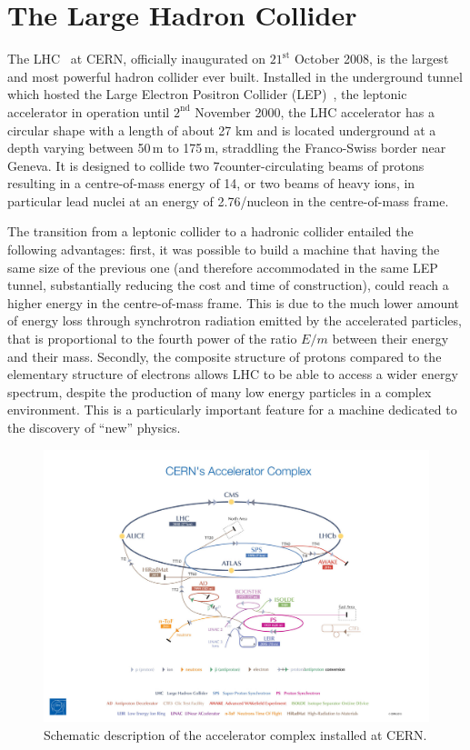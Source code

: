 \section{The Large Hadron Collider}
\label{sec:LHC}

The LHC~\cite{Pettersson:291782,Bruning:782076,Bruning:815187,Benedikt:823808} at CERN, officially inaugurated on $21^\mathrm{st}$ October 2008, is the largest and most powerful hadron collider ever built. Installed in the underground tunnel which hosted the Large Electron Positron Collider (LEP)~\cite{LEPreport1,LEPreport2,Wyss:314187}, the leptonic accelerator in operation until $2^\mathrm{nd}$ November 2000, the LHC accelerator has a circular shape with a length of about 27 km and is located underground at a depth varying between 50\,m to 175\,m, straddling the Franco-Swiss border near Geneva. It is designed to collide two 7\TeV counter-circulating beams of protons resulting in a centre-of-mass energy of 14\TeV, or two beams of heavy ions, in particular lead nuclei at an energy of 2.76\TeV/nucleon in the centre-of-mass frame.

The transition from a leptonic collider to a hadronic collider entailed the following
advantages: first, it was possible to build a machine that having the same size of the previous one (and therefore accommodated in the same LEP tunnel, substantially reducing the cost and time of construction), could reach a higher energy in the centre-of-mass frame. This is due to the much lower amount of energy loss through synchrotron radiation emitted by the accelerated particles, that is proportional to the fourth power of the ratio $E/m$ between their energy and their mass. Secondly, the composite structure of protons compared to the elementary structure of electrons allows LHC to be able to access a wider energy spectrum, despite the production of many low energy particles
in a complex environment. This is a particularly important feature for a machine dedicated to the discovery of ``new'' physics.

\begin{figure}[htb]
\centering
\includegraphics[width=\textwidth]{images/LHC.jpg}
\caption{Schematic description of the accelerator complex installed at CERN.}\label{fig:LHC}
\end{figure}

